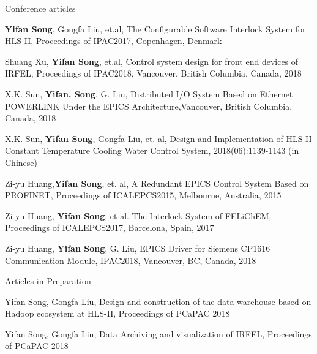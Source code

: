 \begin{cventries}
\cventry
   {Conference articles} %
   {} %
   {} %
   {} %
   {
   	\begin{cvitems} %
   		\item {\textbf{Yifan Song}, Gongfa Liu, et.al, The Configurable Software Interlock System for HLS-II, Proceedings of IPAC2017, Copenhagen, Denmark}
   		\item {Shuang Xu, \textbf{Yifan Song}, et.al, Control system design for front end devices of IRFEL, Proceedings of IPAC2018, Vancouver, British Columbia, Canada, 2018}
   		\item{X.K. Sun, \textbf{Yifan. Song}, G. Liu, Distributed I/O System Based on Ethernet POWERLINK Under the EPICS Architecture,Vancouver, British Columbia, Canada, 2018}
   		\item{X.K. Sun, \textbf{Yifan Song}, Gongfa Liu, et. al, Design and Implementation of HLS-II Constant Temperature Cooling Water Control System, 2018(06):1139-1143 (in Chinese)}
   		\item {Zi-yu Huang,\textbf{Yifan Song}, et. al, A Redundant EPICS Control System Based on PROFINET, Proceedings of ICALEPCS2015, Melbourne, Australia, 2015}
   		\item {Zi-yu Huang, \textbf{Yifan Song}, et al. The Interlock System of FELiChEM, Proceedings of ICALEPCS2017, Barcelona, Spain, 2017}
   		\item {Zi-yu Huang, \textbf{Yifan Song}, G. Liu, EPICS Driver for Siemens CP1616 Communication Module, IPAC2018, Vancouver, BC, Canada, 2018}
   	\end{cvitems}
   }

  \cventry
    {Articles in Preparation} %
    {} %
    {} %
    {} %
    {
      \begin{cvitems} %
        \item {Yifan Song, Gongfa Liu, Design and construction of the data warehouse based on Hadoop ecosystem at HLS-II, Proceedings of PCaPAC 2018}
        \item {Yifan Song, Gongfa Liu, Data Archiving and visualization of IRFEL, Proceedings of PCaPAC 2018}
      \end{cvitems}
    }
   
\end{cventries}
